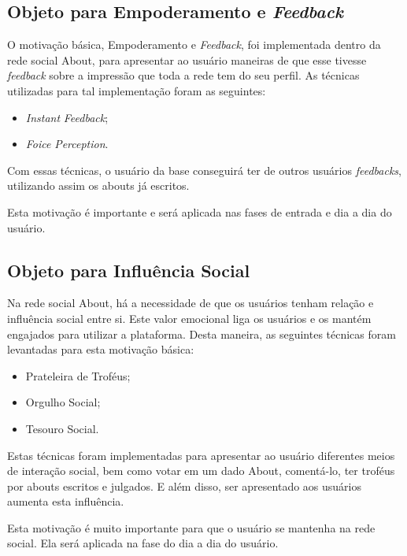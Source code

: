 \subsection{Objeto para Empoderamento e \textit{Feedback}}
\label{sub:objeto_empoderamento_feedback}
O motivação básica, Empoderamento e \textit{Feedback}, foi implementada dentro da rede social About, para apresentar
ao usuário maneiras de que esse tivesse \textit{feedback} sobre a impressão que toda a rede
tem do seu perfil. As técnicas utilizadas para tal implementação foram as seguintes:

\begin{itemize}
    \item \textit{Instant} \textit{Feedback};
    \item \textit{Foice} \textit{Perception}.
\end{itemize}

Com essas técnicas, o usuário da base conseguirá ter de outros usuários \textit{feedbacks},
utilizando assim os abouts já escritos.

Esta motivação é importante e será aplicada nas fases de entrada e dia a dia do usuário.

\subsection{Objeto para Influência Social}
\label{sub:objeto_influencia_social}
Na rede social About, há a necessidade de que os usuários tenham relação e influência
social entre si. Este valor emocional liga os usuários e os mantém engajados para utilizar
a plataforma. Desta maneira, as seguintes técnicas foram levantadas para esta motivação
básica:

\begin{itemize}
    \item Prateleira de Troféus;
    \item Orgulho Social;
    \item Tesouro Social.
\end{itemize}

Estas técnicas foram implementadas para apresentar ao usuário diferentes meios de interação
social, bem como votar em um dado About, comentá-lo, ter troféus por abouts escritos e julgados. 
E além disso, ser apresentado aos usuários aumenta esta influência.

Esta motivação é muito importante para que o usuário se mantenha na rede social. Ela será aplicada
na fase do dia a dia do usuário.


